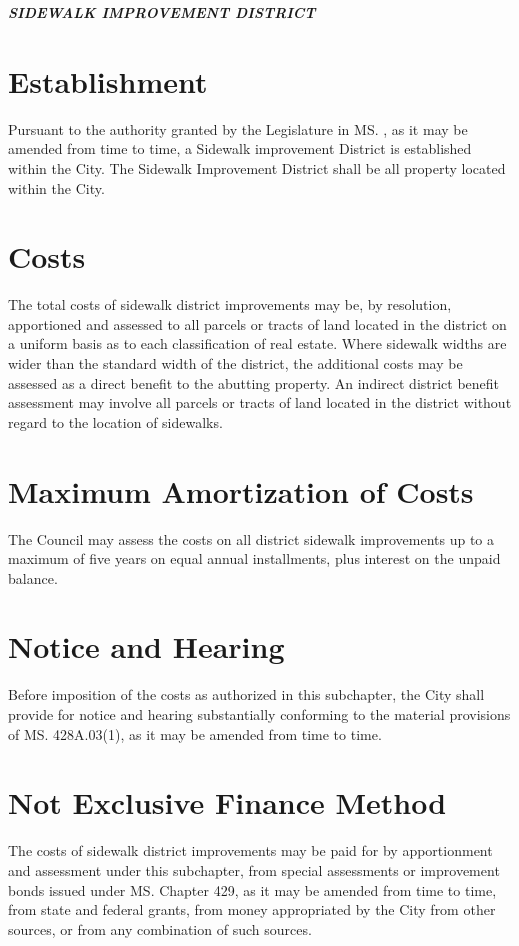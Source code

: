 \begin{center}
    \textbf{\emph{SIDEWALK IMPROVEMENT DISTRICT}}
\end{center}

\setcounter{section}{19}
\section{Establishment}
Pursuant to the authority granted by the Legislature in MS. , as it may be amended from time to time, a Sidewalk improvement District is established within the City. The Sidewalk Improvement District shall be all property located within the City.
\section{Costs}
The total costs of sidewalk district improvements may be, by resolution, apportioned and assessed to all parcels or tracts of land located in the district on a uniform basis as to each classification of real estate. Where sidewalk widths are wider than the standard width of the district, the additional costs may be assessed as a direct benefit to the abutting property. An indirect district benefit assessment may involve all parcels or tracts of land located in the district without regard to the location of sidewalks.
\section{Maximum Amortization of Costs}
The Council may assess the costs on all district sidewalk improvements up to a maximum of five years on equal annual installments, plus interest on the unpaid balance.
\section{Notice and Hearing}
Before imposition of the costs as authorized in this subchapter, the City shall provide for notice and hearing substantially conforming to the material provisions of MS. \textsection 428A.03(1), as it may be amended from time to time.
\section{Not Exclusive Finance Method}
The costs of sidewalk district improvements may be paid for by apportionment and assessment under this subchapter, from special assessments or improvement bonds issued under MS. Chapter 429, as it may be amended from time to time, from state and federal grants, from money appropriated by the City from other sources, or from any combination of such sources.
